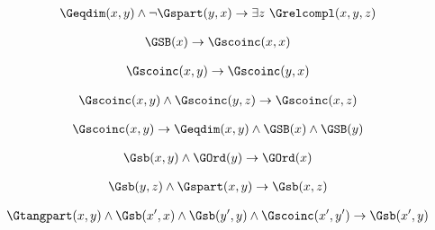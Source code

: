\begin{erin}
    \begin{align*}
        \Geqdim(x,y) \wedge \neg\Gspart(y,x) \to \exists z\ \Grelcompl(x,y,z)
    \end{align*}
\end{erin}

\begin{erin}
    \begin{align*}
        \GSB(x) \to \Gscoinc(x,x)
    \end{align*}
\end{erin}

\begin{erin}
    \begin{align*}
        \Gscoinc(x,y) \to \Gscoinc(y,x)
    \end{align*}
\end{erin}

\begin{erin}
    \begin{align*}
        \Gscoinc(x,y) \wedge \Gscoinc(y,z) \to \Gscoinc(x,z)
    \end{align*}
\end{erin}

\begin{erin}
    \begin{align*}
        \Gscoinc(x,y) \to \Geqdim(x,y) \wedge \GSB(x) \wedge \GSB(y)
    \end{align*}
\end{erin}

\begin{erin}
    \begin{align*}
        \Gsb(x,y) \wedge \GOrd(y) \to \GOrd(x)
    \end{align*}
\end{erin}

\begin{erin}
    \begin{align*}
        \Gsb(y,z) \wedge \Gspart(x,y) \to \Gsb(x,z)
    \end{align*}
\end{erin}

\begin{erin}
    \begin{align*}
        \Gtangpart(x,y) \wedge \Gsb(x',x) \wedge \Gsb(y',y) \wedge \Gscoinc(x',y') \to \Gsb(x',y)
    \end{align*}
\end{erin}
                
